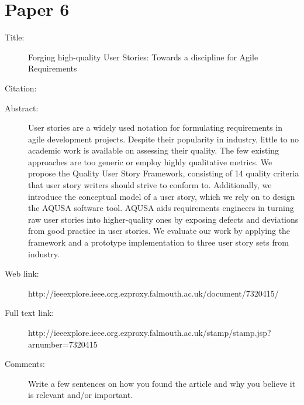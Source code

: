 \documentclass{scrartcl}
\begin{document}
\section*{Paper 6}
\begin{description}
\item[Title:] Forging high-quality User Stories: Towards a discipline for Agile Requirements 
\item[Citation:] \cite{lucassen2015forging}
\item[Abstract:] User stories are a widely used notation for formulating requirements in agile development projects. Despite their popularity in industry, little to no academic work is available on assessing their quality. The few existing approaches are too generic or employ highly qualitative metrics. We propose the Quality User Story Framework, consisting of 14 quality criteria that user story writers should strive to conform to. Additionally, we introduce the conceptual model of a user story, which we rely on to design the AQUSA software tool. AQUSA aids requirements engineers in turning raw user stories into higher-quality ones by exposing defects and deviations from good practice in user stories. We evaluate our work by applying the framework and a prototype implementation to three user story sets from industry.
\item[Web link:] http://ieeexplore.ieee.org.ezproxy.falmouth.ac.uk/document/7320415/
\item[Full text link:] http://ieeexplore.ieee.org.ezproxy.falmouth.ac.uk/stamp/stamp.jsp?arnumber=7320415
\item[Comments:] Write a few sentences on how you found the article and why you believe it is relevant and/or important.
\end{description}



\end{document}
